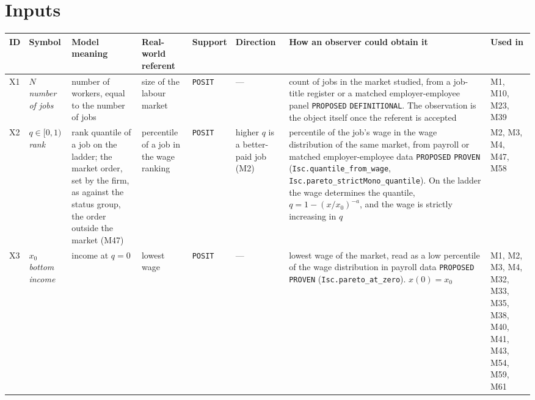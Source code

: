 \documentclass[10pt]{article}
\begin{document}
\section{Inputs}
{\small
\begin{longtable}{>{\raggedright\arraybackslash}p{0.8cm} >{\raggedright\arraybackslash}p{2.2cm} >{\raggedright\arraybackslash}p{4.0cm} >{\raggedright\arraybackslash}p{3.6cm} >{\raggedright\arraybackslash}p{1.6cm} >{\raggedright\arraybackslash}p{4.0cm} >{\raggedright\arraybackslash}p{4.6cm} >{\raggedright\arraybackslash}p{1.8cm}}
\toprule ID & Symbol & Model meaning & Real-world referent & Support & Direction & How an observer could obtain it & Used in \\ \midrule \endhead
X1 & $N$ \newline \textit{number of jobs} & number of workers, equal to the number of jobs & size of the labour market & \texttt{POSIT} & --- & count of jobs in the market studied, from a job-title register or a matched employer-employee panel \newline \texttt{PROPOSED} \newline \texttt{DEFINITIONAL}. The observation is the object itself once the referent is accepted & M1, M10, M23, M39 \\ \midrule
X2 & $q\in[0,1)$ \newline \textit{rank} & rank quantile of a job on the ladder; the market order, set by the firm, as against the status group, the order outside the market (M47) & percentile of a job in the wage ranking & \texttt{POSIT} & higher $q$ is a better-paid job (M2) & percentile of the job's wage in the wage distribution of the same market, from payroll or matched employer-employee data \newline \texttt{PROPOSED} \newline \texttt{PROVEN} (\nolinkurl{Isc.quantile_from_wage}, \nolinkurl{Isc.pareto_strictMono_quantile}). On the ladder the wage determines the quantile, $q=1-(x/x_0)^{-a}$, and the wage is strictly increasing in $q$ & M2, M3, M4, M47, M58 \\ \midrule
X3 & $x_0$ \newline \textit{bottom income} & income at $q=0$ & lowest wage & \texttt{POSIT} & --- & lowest wage of the market, read as a low percentile of the wage distribution in payroll data \newline \texttt{PROPOSED} \newline \texttt{PROVEN} (\nolinkurl{Isc.pareto_at_zero}). $x(0)=x_0$ & M1, M2, M3, M4, M32, M33, M35, M38, M40, M41, M43, M54, M59, M61 \\ \midrule

\end{longtable}}
\end{document}
